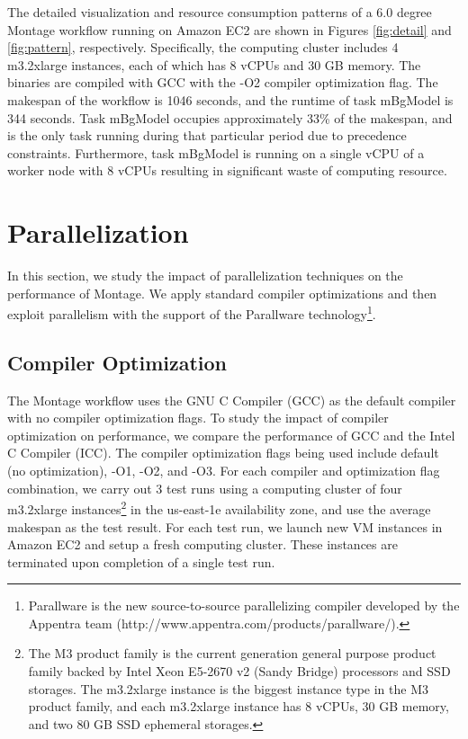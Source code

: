 The detailed visualization and  resource consumption patterns of a 6.0 degree Montage workflow running on Amazon EC2 are shown in Figures \ref{fig:detail} and \ref{fig:pattern}, respectively. Specifically, the computing cluster includes 4 m3.2xlarge instances, each of which has 8 vCPUs and 30 GB memory. The binaries are compiled with GCC with the -O2 compiler optimization flag. The makespan of the workflow is 1046 seconds, and the runtime of task mBgModel is 344 seconds. Task mBgModel occupies approximately 33\% of the makespan, and is the only task running during that particular period due to precedence constraints. Furthermore, task mBgModel is running on a single vCPU of a worker node with 8 vCPUs resulting in significant waste of computing resource. 


\section{Parallelization}
\label{v1_sec:parallel}

In this section, we study the impact of parallelization techniques on the performance of Montage. We apply standard compiler optimizations and then exploit parallelism with the support of the Parallware technology\footnote{Parallware is the new source-to-source parallelizing compiler developed by the Appentra team  (http://www.appentra.com/products/parallware/).}. 


\subsection{Compiler Optimization}
\label{sec:compiler}
The Montage workflow uses the GNU C Compiler (GCC) as the default compiler with no compiler optimization flags. To study the impact of compiler optimization on performance, we compare the performance of GCC and the Intel C Compiler (ICC). The compiler optimization flags being used include default (no optimization), -O1, -O2, and -O3. For each compiler and optimization flag combination, we carry out 3 test runs using a computing cluster of four m3.2xlarge instances\footnote{The M3 product family is the current generation general purpose product family backed by Intel Xeon E5-2670 v2 (Sandy Bridge) processors and SSD storages. The m3.2xlarge instance is the biggest instance type in the M3 product family, and each m3.2xlarge instance has 8 vCPUs, 30 GB memory, and two 80 GB SSD ephemeral storages.} in the us-east-1e availability zone, and use the average makespan as the test result. For each test run, we launch new VM instances in Amazon EC2 and setup a fresh computing cluster. These instances are terminated upon completion of a single test run. 

